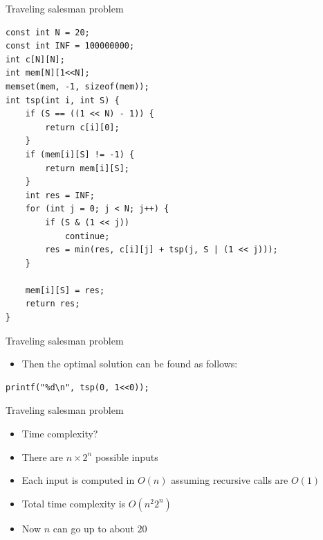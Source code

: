 \documentclass{beamer}
\begin{document}
\begin{frame}{Traveling salesman problem}
    \begin{verbatim}
const int N = 20;
const int INF = 100000000;
int c[N][N];
int mem[N][1<<N];
memset(mem, -1, sizeof(mem));
int tsp(int i, int S) {
    if (S == ((1 << N) - 1)) {
        return c[i][0];
    }
    if (mem[i][S] != -1) {
        return mem[i][S];
    }
    int res = INF;
    for (int j = 0; j < N; j++) {
        if (S & (1 << j))
            continue;
        res = min(res, c[i][j] + tsp(j, S | (1 << j)));
    }

    mem[i][S] = res;
    return res;
}
    \end{verbatim}
\end{frame}

\begin{frame}{Traveling salesman problem}
    \vspace{30pt}
    \begin{itemize}
\item Then the optimal solution can be found as follows:
    \end{itemize}

    \vspace{20pt}
    \begin{verbatim}
printf("%d\n", tsp(0, 1<<0));
    \end{verbatim}
\end{frame}

\begin{frame}[plain]{Traveling salesman problem}
    \vspace{30pt}
    \begin{itemize}
        \item Time complexity?
        \vspace{10pt}
        \item There are $n \times 2^n$ possible inputs
        \item Each input is computed in $O(n)$ assuming recursive calls are $O(1)$
        \item Total time complexity is $O(n^2 2^n)$
            \vspace{10pt}
        \item Now $n$ can go up to about $20$
    \end{itemize}
\end{frame}
\end{document}
